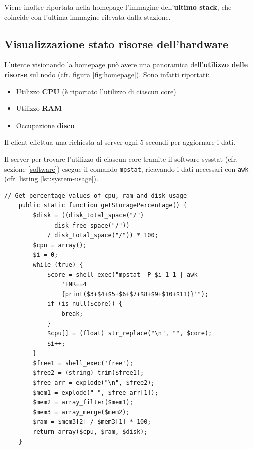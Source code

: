 Viene inoltre riportata nella homepage l'immagine dell'\textbf{ultimo stack}, che coincide con l'ultima immagine rilevata dalla stazione.

\subsection{Visualizzazione stato risorse dell'hardware} \label{stato-risorse-hw}

L'utente visionando la homepage può avere una panoramica dell'\textbf{utilizzo delle risorse} sul nodo (cfr. figura \ref{fig:homepage}). Sono infatti riportati:
\begin{itemize}[noitemsep,nolistsep]
    \item Utilizzo \textbf{CPU} (è riportato l'utilizzo di ciascun core)
    \item Utilizzo \textbf{RAM}
    \item Occupazione \textbf{disco}
\end{itemize}

Il client effettua una richiesta al server ogni 5 secondi per aggiornare i dati. 

Il server per trovare l'utilizzo di ciascun core tramite il software sysstat (cfr. sezione \ref{software}) esegue il comando \texttt{mpstat}, ricavando i dati necessari con \texttt{awk} (cfr. listing \ref{lst:system-usage}).

\begin{lstlisting}[style=PHP,caption={Metodo PHP per ottenere l'utilizzo di CPU, RAM e disco.},captionpos=b,label={lst:system-usage}]
    // Get percentage values of cpu, ram and disk usage
    public static function getStoragePercentage() {
        $disk = ((disk_total_space("/") 
            - disk_free_space("/"))
            / disk_total_space("/")) * 100;
        $cpu = array();
        $i = 0;
        while (true) {
            $core = shell_exec("mpstat -P $i 1 1 | awk
                'FNR==4
                {print($3+$4+$5+$6+$7+$8+$9+$10+$11)}'");
            if (is_null($core)) {
                break;
            }
            $cpu[] = (float) str_replace("\n", "", $core);
            $i++;
        }
        $free1 = shell_exec('free');
        $free2 = (string) trim($free1);
        $free_arr = explode("\n", $free2);
        $mem1 = explode(" ", $free_arr[1]);
        $mem2 = array_filter($mem1);
        $mem3 = array_merge($mem2);
        $ram = $mem3[2] / $mem3[1] * 100;
        return array($cpu, $ram, $disk);
    }
\end{lstlisting}